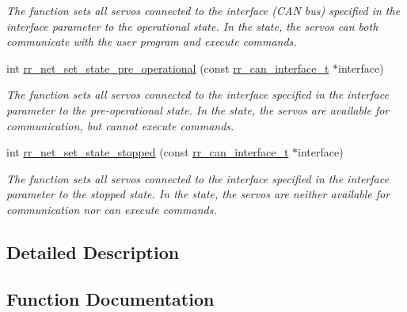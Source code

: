 \begin{DoxyCompactItemize}
\begin{DoxyCompactList}\small\item\em The function sets all servos connected to the interface (C\+AN bus) specified in the \textquotesingle{}interface\textquotesingle{} parameter to the operational state. In the state, the servos can both communicate with the user program and execute commands. \end{DoxyCompactList}\item 
int \hyperlink{group___system__control_ga6a6c46f69a8586cf7bd129a55a775eb7}{rr\+\_\+net\+\_\+set\+\_\+state\+\_\+pre\+\_\+operational} (const \hyperlink{structrr__can__interface__t}{rr\+\_\+can\+\_\+interface\+\_\+t} $\ast$interface)
\begin{DoxyCompactList}\small\item\em The function sets all servos connected to the interface specified in the \textquotesingle{}interface\textquotesingle{} parameter to the pre-\/operational state. In the state, the servos are available for communication, but cannot execute commands. \end{DoxyCompactList}\item 
int \hyperlink{group___system__control_ga7dd178eafeae0d80edd60e3aee6e13b9}{rr\+\_\+net\+\_\+set\+\_\+state\+\_\+stopped} (const \hyperlink{structrr__can__interface__t}{rr\+\_\+can\+\_\+interface\+\_\+t} $\ast$interface)
\begin{DoxyCompactList}\small\item\em The function sets all servos connected to the interface specified in the \textquotesingle{}interface\textquotesingle{} parameter to the stopped state. In the state, the servos are neither available for communication nor can execute commands. \end{DoxyCompactList}\end{DoxyCompactItemize}


\subsection{Detailed Description}


\subsection{Function Documentation}
\mbox{\label{group___system__control_ga3141174e38250e0107cc6de9681bcc47}} 
